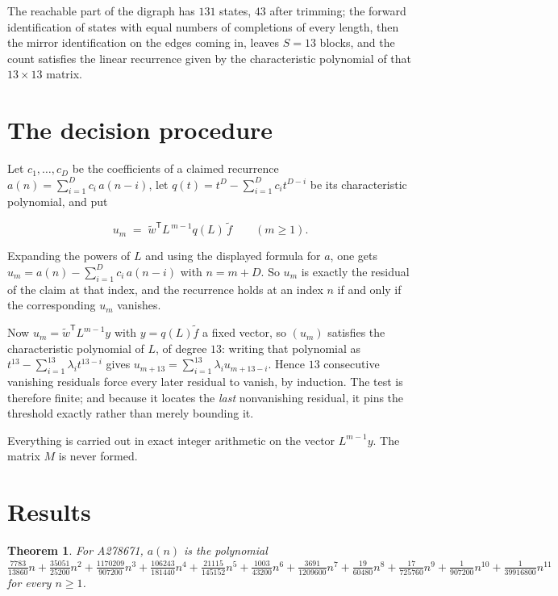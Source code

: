 \documentclass[11pt]{article}
\newtheorem{theorem}{Theorem}
\theoremstyle{definition}
\begin{document}
The reachable part of the digraph has $131$ states, $43$ after trimming; the forward identification of states with equal numbers of completions of every length, then the mirror identification on the edges coming in, leaves $S = 13$ blocks, and the count satisfies the linear recurrence given by the characteristic polynomial of that $13\times13$ matrix.

\section{The decision procedure}

Let $c_1,\dots,c_D$ be the coefficients of a claimed recurrence $a(n) = \sum_{i=1}^{D} c_i\,a(n-i)$, let $q(t) = t^{D} - \sum_{i=1}^{D} c_i t^{D-i}$ be its characteristic polynomial, and put

\[u_m \;=\; \tilde w^{\mathsf T} L^{\,m-1} q(L)\,\tilde f \qquad (m \ge 1).\]

Expanding the powers of $L$ and using the displayed formula for $a$, one gets $u_m = a(n) - \sum_{i=1}^{D} c_i\,a(n-i)$ with $n = m + D$. So $u_m$ is exactly the residual of the claim at that index, and the recurrence holds at an index $n$ if and only if the corresponding $u_m$ vanishes.

Now $u_m = \tilde w^{\mathsf T} L^{m-1} y$ with $y = q(L)\tilde f$ a fixed vector, so $(u_m)$ satisfies the characteristic polynomial of $L$, of degree $13$: writing that polynomial as $t^{13} - \sum_{i=1}^{13} \lambda_i t^{13-i}$ gives $u_{m+13} = \sum_{i=1}^{13} \lambda_i u_{m+13-i}$. Hence $13$ consecutive vanishing residuals force every later residual to vanish, by induction. The test is therefore finite; and because it locates the {\itshape last} nonvanishing residual, it pins the threshold exactly rather than merely bounding it.

Everything is carried out in exact integer arithmetic on the vector $L^{m-1}y$. The matrix $M$ is never formed.

\section{Results}

\begin{theorem} For A278671, $a(n)$ is the polynomial $\frac{7783}{13860}n + \frac{35051}{25200}n^{2} + \frac{1170209}{907200}n^{3} + \frac{106243}{181440}n^{4} + \frac{21115}{145152}n^{5} + \frac{1003}{43200}n^{6} + \frac{3691}{1209600}n^{7} + \frac{19}{60480}n^{8} + \frac{17}{725760}n^{9} + \frac{1}{907200}n^{10} + \frac{1}{39916800}n^{11}$ for every $n \ge 1$.\end{theorem}
\end{document}
